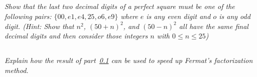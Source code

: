 \documentclass[12pt]{article}
\begin{document}
    \subsection{}\label{5a} \textit{Show that the last two decimal digits of a perfect square must be one of the following pairs: $\{00, e1, e4, 25, o6, e9\}$ where $e$ is any even digit and $o$ is any odd digit. (Hint: Show that $n^2$, $(50 + n)^2$, and $(50 - n)^2$ all have the same final decimal digits and then consider those integers $n$ with $0 \leq n \leq 25$)}

    \subsection{} \textit{Explain how the result of part~\ref{5a} can be used to speed up Fermat's factorization method.}
\end{document}
